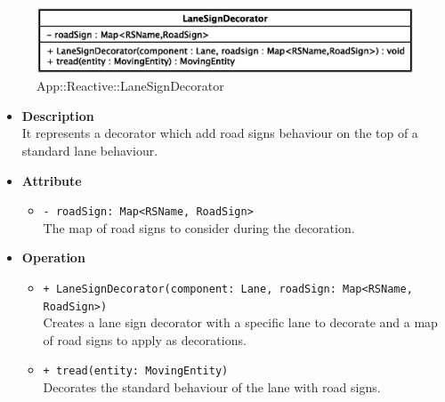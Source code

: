 \begin{figure}[h]
\centering
\includegraphics[scale=0.6,keepaspectratio]{images/solution/lane_sign_decorator.eps}
\caption{App::Reactive::LaneSignDecorator}
\label{fig:sd-app-lane_sign_decorator}
\end{figure}
\FloatBarrier
\begin{itemize}
  \item \textbf{Description} \\
    It represents a decorator which add road signs behaviour on the top of a standard lane behaviour. 
  \item \textbf{Attribute}
  \begin{itemize}
    \item \texttt{- roadSign: Map<RSName, RoadSign>} \\
The map of road signs to consider during the decoration.
  \end{itemize}
  \item \textbf{Operation}
   \begin{itemize} 
   \item \texttt{+ LaneSignDecorator(component: Lane, roadSign: Map<RSName, RoadSign>)} \\
Creates a lane sign decorator with a specific lane to decorate and a map of road signs to apply as decorations.
    \item \texttt{+ tread(entity: MovingEntity)} \\
Decorates the standard behaviour of the lane with road signs.  
  \end{itemize}
\end{itemize}
